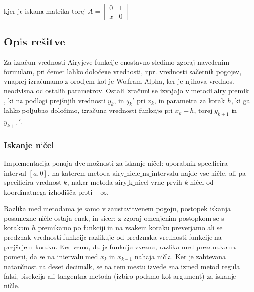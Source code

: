 \documentclass[12pt,a4paper]{article}
\begin{document}
kjer je iskana matrika torej $A=\begin{bmatrix}0 & 1 \\ x & 0\end{bmatrix}$


\subsection{Opis rešitve}
Za izračun vrednosti Airyjeve funkcije enostavno sledimo zgoraj navedenim formulam, pri čemer lahko določene vrednosti, npr. vrednosti začetnih pogojev, vnaprej izračunamo z orodjem kot je Wolfram Alpha, ker je njihova vrednost neodvisna od ostalih parametrov. Ostali izračuni se izvajajo v metodi $\text{airy\_premik}$, ki na podlagi prejšnjih vrednosti $y_k$, in $y_k'$ pri $x_k$, in parametra za korak $h$, ki ga lahko poljubno določimo, izračuna vrednosti funkcije pri $x_k+h$,  torej $y_{k+1}$ in $y_{k+1}'$.


\subsubsection{Iskanje ničel}
Implementacija ponuja dve možnosti za iskanje ničel: uporabnik specificira interval $[a,0]$, na katerem  metoda $\text{airy\_nicle\_na\_intervalu}$ najde vse ničle, ali pa specificira vrednost $k$, nakar  metoda $\text{airy\_k\_nicel}$ vrne prvih $k$ ničel od koordinatnega izhodišča proti $-\infty$.


Razlika med metodama je samo v zaustavitvenem pogoju, postopek iskanja posamezne ničle ostaja enak, in sicer: z zgoraj omenjenim postopkom se s korakom $h$ premikamo po funkciji in na vsakem koraku preverjamo ali se predznak vrednosti funkcije razlikuje od predznaka vrednosti funkcije na prejšnjem koraku. Ker vemo, da je funkcija zvezna, razlika med prezdnakoma pomeni,  da se na intervalu med $x_k$ in $x_{k+1}$ nahaja ničla. Ker je zahtevana natančnost na deset decimalk, se na tem mestu izvede ena izmed metod regula falsi, bisekcija ali tangentna metoda (izbiro podamo kot argument) za iskanje ničle.
\end{document}
